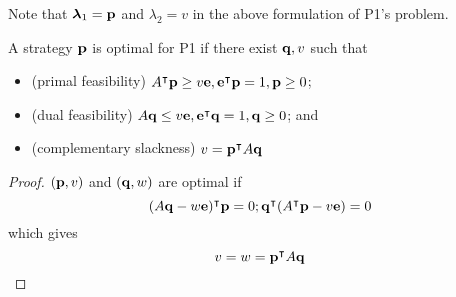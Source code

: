 Note that \( \bm \lambda_1 = \vb p \) and \( \lambda_2 = v \) in the above formulation of P1's problem.
\begin{theorem}
	A strategy \( \vb p \) is optimal for P1 if there exist \( \vb q, v \) such that
	\begin{itemize}
		\item (primal feasibility) \( A^\intercal \vb p \geq v \vb e, \vb e^\intercal \vb p = 1, \vb p \geq 0 \);
		\item (dual feasibility) \( A\vb q \leq v\vb e, \vb e^\intercal \vb q = 1, \vb q \geq 0 \); and
		\item (complementary slackness) \( v = \vb p^\intercal A \vb q \)
	\end{itemize}
\end{theorem}
\begin{proof}
	\( (\vb p, v) \) and \( (\vb q, w) \) are optimal if
	\[
		(A \vb q - w \vb e)^\intercal \vb p = 0; \vb q^\intercal(A^\intercal \vb p - v \vb e) = 0
	\]
	which gives
	\[
		v = w = \vb p^\intercal A \vb q
	\]
\end{proof}

